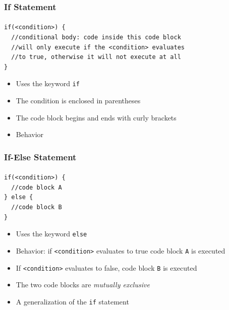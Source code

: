 \documentclass[]{beamer}
\begin{document}
\begin{frame}[fragile]
    \frametitle{If Statement}
    \framesubtitle{}

\begin{verbatim}
if(<condition>) {
  //conditional body: code inside this code block
  //will only execute if the <condition> evaluates
  //to true, otherwise it will not execute at all
}
\end{verbatim}    

\begin{itemize}[<+->]
  \item Uses the keyword \texttt{if}
  \item The condition is enclosed in parentheses
  \item The code block begins and ends with curly brackets
  \item Behavior
\end{itemize}

\end{frame}

\begin{frame}[fragile]
    \frametitle{If-Else Statement}
    \framesubtitle{}

\begin{verbatim}
if(<condition>) {
  //code block A
} else {
  //code block B
}
\end{verbatim}    

\begin{itemize}[<+->]
  \item Uses the keyword \texttt{else}
  \item Behavior: if \texttt{<condition>} evaluates to true
  code block \texttt{A} is executed
  \item If \texttt{<condition>} evaluates to false, 
  code block \texttt{B} is executed
  \item The two code blocks are \emph{mutually exclusive}
  \item A generalization of the \texttt{if} statement
\end{itemize}

\end{frame}
\end{document}
